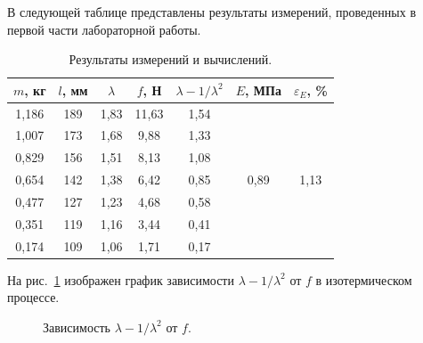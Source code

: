 \documentclass[a4paper,12pt]{article} %
\begin{document}
	В следующей таблице представлены результаты измерений, проведенных в первой части лабораторной работы.
	\begin{table}[H]
		\caption{Результаты измерений и вычислений.}
		\label{table:results_1}
		\begin{tabular}{|c|c|c|c|c|c|c|}
\hline
$m$, кг & $l$, мм & $\lambda$ & $f$, Н & $\lambda - 1/ \lambda^2$ & $E$, МПа             & $\varepsilon_E$, \%   \\ \hline
1,186   & 189     & 1,83      & 11,63  & 1,54                     & \multirow{7}{*}{0,89} & \multirow{7}{*}{1,13} \\ \cline{1-5}
1,007   & 173     & 1,68      & 9,88   & 1,33                     &                      &                       \\ \cline{1-5}
0,829   & 156     & 1,51      & 8,13   & 1,08                     &                      &                       \\ \cline{1-5}
0,654   & 142     & 1,38      & 6,42   & 0,85                     &                      &                       \\ \cline{1-5}
0,477   & 127     & 1,23      & 4,68   & 0,58                     &                      &                       \\ \cline{1-5}
0,351   & 119     & 1,16      & 3,44   & 0,41                     &                      &                       \\ \cline{1-5}
0,174   & 109     & 1,06      & 1,71   & 0,17                     &                      &                       \\ \hline
\end{tabular}
	\end{table}
	На рис.~\ref{ris:Graph_1} изображен график зависимости $\lambda - 1/ \lambda^2$ от $f$ в изотермическом процессе.
	
	\begin{figure}[H]
		\caption{Зависимость $\lambda - 1/ \lambda^2$ от $f$.}
		\label{ris:Graph_1}
	\end{figure}
\end{document}
